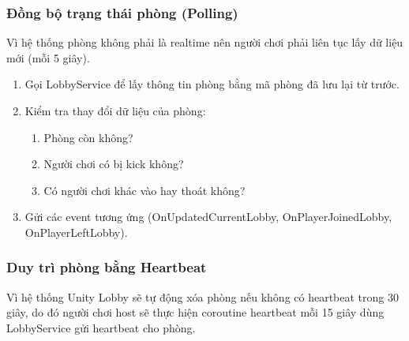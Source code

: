 \subsubsection{Đồng bộ trạng thái phòng (Polling)}
    Vì hệ thống phòng không phải là realtime nên người chơi phải liên tục lấy dữ liệu mới (mỗi 5 giây).
    \begin{enumerate}[-]
        \item Gọi LobbyService để lấy thông tin phòng bằng mã phòng đã lưu lại từ trước.
        \item Kiểm tra thay đổi dữ liệu của phòng: 
        \begin{enumerate}[+]
            \item Phòng còn không?
            \item Người chơi có bị kick không?
            \item Có người chơi khác vào hay thoát không?
        \end{enumerate}
        \item Gửi các event tương ứng (OnUpdatedCurrentLobby, OnPlayerJoinedLobby, OnPlayerLeftLobby).
    \end{enumerate}
    
\subsubsection{Duy trì phòng bằng Heartbeat}
    Vì hệ thống Unity Lobby sẽ tự động xóa phòng nếu không có heartbeat trong 30 giây, do đó người chơi host sẽ thực hiện coroutine heartbeat mỗi 15 giây dùng LobbyService gửi heartbeat cho phòng.
